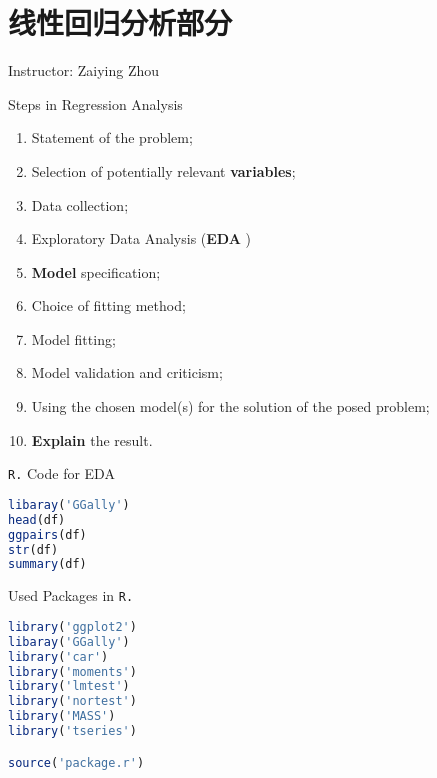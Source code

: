 \section{线性回归分析部分}\label{SecLinearRegressionAnalysis}
\begin{center}
    Instructor: Zaiying Zhou
\end{center}
\begin{point}
    Steps in Regression Analysis
\end{point}

\begin{enumerate}[topsep=2pt,itemsep=2pt]
    \item Statement of the problem;
    \item Selection of potentially relevant \textbf{variables};
    \item Data collection;
    \item Exploratory Data Analysis (\textbf{EDA} )
    \item \textbf{Model} specification;
    \item Choice of fitting method;
    \item Model fitting;
    \item Model validation and criticism;
    \item Using the chosen model(s) for the solution of the posed problem;
    \item \textbf{Explain} the result.
\end{enumerate}

    \lstinline|R.| Code for EDA
\begin{lstlisting}[language=R]
libaray('GGally')
head(df)
ggpairs(df)
str(df)
summary(df)
\end{lstlisting}



\begin{point}
    Used Packages in \lstinline|R.|
\begin{lstlisting}[language=R]
library('ggplot2')
libaray('GGally')
library('car')
library('moments')
library('lmtest')
library('nortest')
library('MASS')
library('tseries')

source('package.r')
\end{lstlisting}

\end{point}


